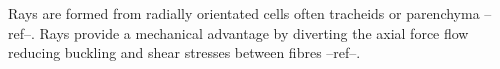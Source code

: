 Rays are formed from radially orientated cells often tracheids or parenchyma
--ref--. Rays provide a mechanical advantage by diverting the axial force flow
reducing buckling and shear stresses between fibres --ref--.
